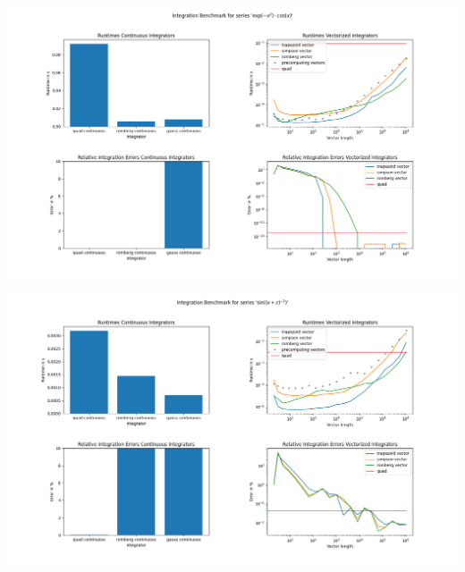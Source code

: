 
\begin{frame}
%
\begin{center}
\includegraphics[width=\linewidth]{./gfx/06-timedints-1}
\end{center}
%
\end{frame}



\begin{frame}
%
\begin{center}
\includegraphics[width=\linewidth]{./gfx/06-timedints-2}
\end{center}
%
\end{frame}



